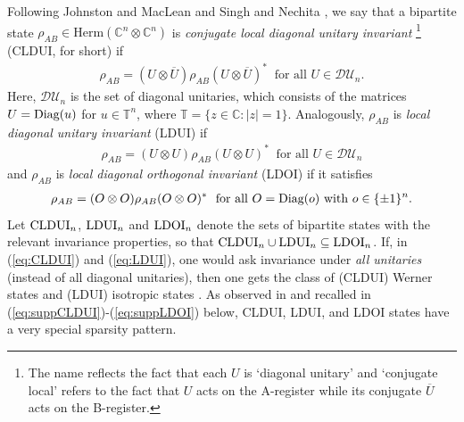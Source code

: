 \documentclass[11pt]{article}
\newcommand{\C}{\ensuremath{\mathbb{C}}} %
\newcommand{\T}{\ensuremath{\mathbb{T}}} %
\newcommand{\MDU}{{\mathcal {DU}}}
\newcommand{\Herm}{\mathrm{Herm}}
\newcommand{\Cnn}{\C^n\ot \C^n}
\newcommand{\CLDUI}{\text{\rm CLDUI}}
\newcommand{\LDUI}{\text{\rm LDUI}}
\newcommand{\LDOI}{\text{\rm LDOI}}
\newcommand{\Diag}{\text{\rm Diag}}
\newcommand{\ot}{\otimes}
\newcommand{\ovU}{\overline U}
\theoremstyle{plain}
\begin{document}
Following Johnston and MacLean \cite{JML-PCP} and Singh and Nechita \cite{SN-CLDUI}, we say  that a bipartite state $\rho_{AB}\in \Herm(\Cnn)$ is  {\em conjugate local diagonal unitary invariant} \footnote{The name reflects the fact that each $U$ is `diagonal unitary' and `conjugate local'  refers to the fact that $U$ acts on the A-register while its conjugate $\ovU$ acts on the B-register.}
(CLDUI, for short) 
if  
\begin{align}\label{eq:CLDUI}
\rho_{AB}= (U\ot \ovU) \rho_{AB} (U\ot \ovU)^* \ \text{ for all } U\in\MDU_n.
\end{align}
Here,  $\MDU_n$ is the set of diagonal unitaries, which consists of the matrices $U=\Diag(u)$ for $u\in \T^n$, where $\T=\{z\in\C: |z|=1\}$.
Analogously, $\rho_{AB}$ is {\em  local diagonal unitary invariant} (LDUI) if
\begin{align}\label{eq:LDUI}
\rho_{AB}= (U\ot U) \rho_{AB} (U\ot U)^* \ \text{ for all } U\in\MDU_n
\end{align}
and $\rho_{AB}$ is {\em  local diagonal orthogonal invariant} (LDOI) if it satisfies 
\begin{align}\label{eq:LDOI}
\rho_{AB}= (O\ot O)\rho_{AB} (O\ot O)^* \ \text{ for all } O=\Diag(o) \text{ with } o\in \{\pm 1\}^n.
\end{align}
Let $\CLDUI_n$, $\LDUI_n$ and $\LDOI_n$ denote the  sets of bipartite states with the relevant invariance properties, so that $\CLDUI_n\cup \LDUI_n\subseteq \LDOI_n$.
If, in (\ref{eq:CLDUI}) and (\ref{eq:LDUI}), one would ask invariance under {\em all unitaries} (instead of all diagonal unitaries), then one  gets the class of (CLDUI) Werner states \cite{Werner} and (LDUI) isotropic states \cite{HH-isotropic}. %
As observed in \cite{JML-PCP,SN-CLDUI} and recalled in (\ref{eq:suppCLDUI})-(\ref{eq:suppLDOI}) below, CLDUI, LDUI, and LDOI states have a very special sparsity pattern. 
\end{document}
